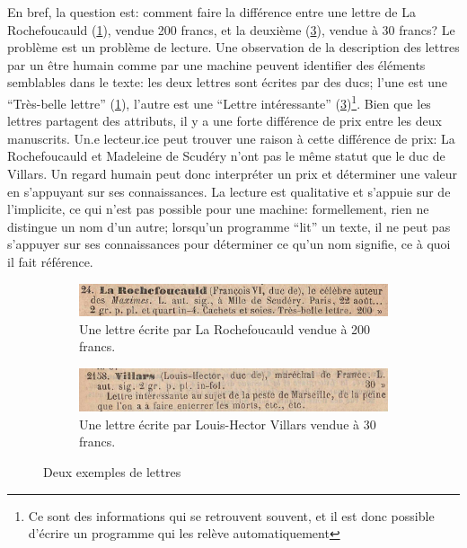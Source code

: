 \documentclass[a4paper, 12pt, twoside]{book}
\begin{document}
En bref, la question est: comment faire la différence entre une lettre de La Rochefoucauld (\ref{fig:rochefoucauld}), vendue 200 francs, et la deuxième (\ref{fig:villars}), vendue à 30 francs? Le problème est un problème de lecture. Une observation de la description des lettres par un être humain comme par une machine peuvent identifier des éléments semblables dans le texte: les deux lettres sont écrites par des ducs; l'une est une \enquote{Très-belle lettre} (\ref{fig:rochefoucauld}), l'autre est une \enquote{Lettre intéressante} (\ref{fig:villars})\footnote{Ce sont des informations qui se retrouvent souvent, et il est donc possible d'écrire un programme qui les relève automatiquement}. Bien que les lettres partagent des attributs, il y a une forte différence de prix entre les deux manuscrits. Un.e lecteur.ice peut trouver une raison à cette différence de prix: La Rochefoucauld et Madeleine de Scudéry n'ont pas le même statut que le duc de Villars. Un regard humain peut donc interpréter un prix et déterminer une valeur en s'appuyant sur ses connaissances. La lecture est qualitative et s'appuie sur de l'implicite, ce qui n'est pas possible pour une machine: formellement, rien ne distingue un nom d'un autre; lorsqu'un programme \enquote{lit} un texte, il ne peut pas s'appuyer sur ses connaissances pour déterminer ce qu'un nom signifie, ce à quoi il fait référence.

\begin{figure}[h!]
	\centering
	\begin{subfigure}{0.8\textwidth}
		\includegraphics[width=\textwidth]{img/cat_000372_e24.png}
		\caption{Une lettre écrite par La Rochefoucauld vendue à 200 francs.}
		\label{fig:rochefoucauld}
	\end{subfigure}
	\begin{subfigure}{0.8\textwidth}
		\includegraphics[width=\textwidth]{img/cat_000382_e2158.png}
		\caption{Une lettre écrite par Louis-Hector Villars vendue à 30 francs.}
		\label{fig:villars}
	\end{subfigure}
	\caption{Deux exemples de lettres}
\end{figure}
\end{document}
